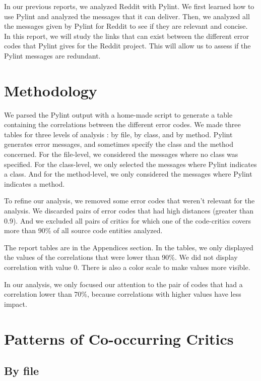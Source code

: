 \documentclass[12pt, a4paper]{article}
\newcommand{\pyl}{\textsf{Pylint}}
\begin{document}
In our previous reports, we analyzed Reddit with \pyl{}.
We first learned how to use \pyl{} and analyzed the messages that it can deliver.
Then, we analyzed all the messages given by \pyl{} for Reddit to see if they are relevant and concise.\\

In this report, we will study the links that can exist between the different error codes that \pyl{} gives for the Reddit project.
This will allow us to assess if the \pyl{} messages are redundant.


\section{Methodology}

We parsed the \pyl{} output with a home-made script to generate a table containing the correlations between the different error codes.
We made three tables for three levels of analysis : by file, by class, and by method.
\pyl{} generates error messages, and sometimes specify the class and the method concerned.
For the file-level, we considered the messages where no class was specified.
For the class-level, we only selected the messages where \pyl{} indicates a class.
And for the method-level, we only considered the messages where \pyl{} indicates a method.

\bigskip
To refine our analysis, we removed some error codes that weren't relevant for the analysis.
We discarded pairs of error codes that had high distances (greater than 0.9).
And we excluded all pairs of critics for which one of the code-critics covers more than 90\% of all source code entities analyzed.

\bigskip
The report tables are in the Appendices section.
In the tables, we only displayed the values of the correlations that were lower than 90\%.
We did not display correlation with value 0.
There is also a color scale to make values more visible.

\bigskip
In our analysis, we only focused our attention to the pair of codes that had a correlation lower than 70\%, because correlations with higher values have less impact.



\section{Patterns of Co-occurring Critics}

\subsection{By file}
\end{document}
